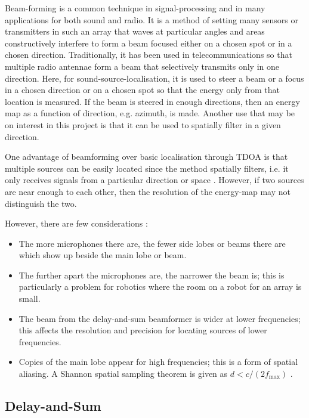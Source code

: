 \documentclass[notitlepage]{report}
\begin{document}
Beam-forming is a common technique in signal-processing and in many applications for both sound and radio. It is a method of setting many sensors or transmitters in such an array that waves at particular angles and areas constructively interfere to form a beam focused either on a chosen spot or in a chosen direction. Traditionally, it has been used in telecommunications so that multiple radio antennae form a beam that selectively transmits only in one direction. Here, for sound-source-localisation, it is used to steer a beam or a focus in a chosen direction or on a chosen spot so that the energy only from that location is measured. If the beam is steered in enough directions, then an energy map as a function of direction, e.g. azimuth, is made. Another use that may be on interest in this project is that it can be used to spatially filter in a given direction.

One advantage of beamforming over basic localisation through TDOA is that multiple sources can be easily located since the method spatially filters, i.e. it only receives signals from a particular direction or space \cite{rascon_localization_2017}. However, if two sources are near enough to each other, then the resolution of the energy-map may not distinguish the two.

However, there are few considerations \cite{argentieri_survey_2015}:
\begin{itemize}
	\item The more microphones there are, the fewer side lobes or beams there are which show up beside the main lobe or beam.
	\item The further apart the microphones are, the narrower the beam is; this is particularly a problem for robotics where the room on a robot for an array is small.
	\item The beam from the delay-and-sum beamformer is wider at lower frequencies; this affects the resolution and precision for locating sources of lower frequencies.
	\item Copies of the main lobe appear for high frequencies; this is a form of spatial aliasing. A Shannon spatial sampling theorem is given as $d<c/(2f_{\text{max}})$ \cite{argentieri_survey_2015}.
\end{itemize}

\subsection{Delay-and-Sum}
\end{document}

